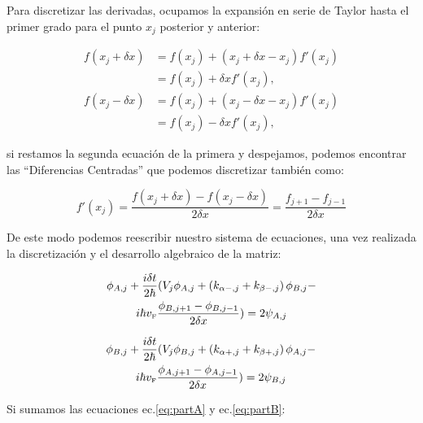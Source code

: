 Para discretizar las derivadas, ocupamos la expansión en serie de Taylor hasta el primer grado para el punto $x_j$ posterior y anterior:

\begin{align}
    \label{eq:TaylorBeforeAndAfter}
    f(x_j+\delta x)&=f(x_j) + (x_j+\delta x-x_j)f'(x_j)\nonumber\\
    &=f(x_j)+\delta xf'(x_j),\nonumber\\
    f(x_j-\delta x)&=f(x_j) + (x_j-\delta x-x_j)f'(x_j)\nonumber\\
    &=f(x_j)-\delta xf'(x_j),
\end{align}

\noindent si restamos la segunda ecuación de la primera y despejamos, podemos encontrar las ``Diferencias Centradas'' que podemos discretizar también como:

\begin{equation}
    \label{eq:diferenciasCentradas}
    f'(x_j)=\frac{f(x_j+\delta x)-f(x_j-\delta x)}{2\delta x} = \frac{f_{j+1}-f_{j-1}}{2\delta x}
\end{equation}

De este modo podemos reescribir nuestro sistema de ecuaciones, una vez realizada la discretización y el desarrollo algebraico de la matriz:

\begin{multline}
    \label{eq:partA}
    \phi_{A, j} + \frac{i\delta t}{2\hbar}(V_j\phi_{A,j} + \left(k_{\alpha-,j}+k_{\beta-,j}\right)\phi_{B,j}-\\
    i\hbar v_{\mbox{\tiny F}}\frac{\phi_{B, j+1}-\phi_{B, j-1}}{2\delta x}) = 2\psi_{A,j}
\end{multline}

\begin{multline}
    \label{eq:partB}
    \phi_{B, j} + \frac{i\delta t}{2\hbar}(V_j\phi_{B,j} + \left(k_{\alpha+,j}+k_{\beta+,j}\right)\phi_{A,j}-\\
    i\hbar v_{\mbox{\tiny F}}\frac{\phi_{A, j+1}-\phi_{A, j-1}}{2\delta x}) = 2\psi_{B,j}
\end{multline}

Si sumamos las ecuaciones ec.\eqref{eq:partA} y ec.\eqref{eq:partB}:

